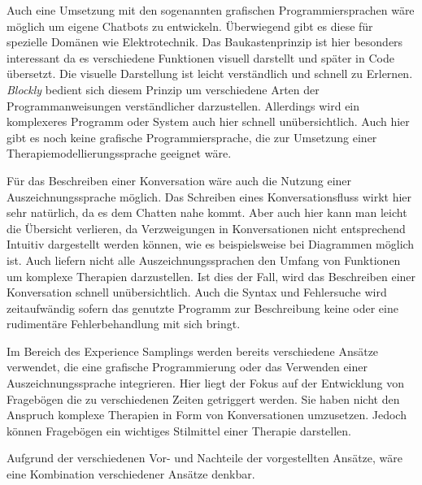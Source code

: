Auch eine Umsetzung mit den sogenannten grafischen Programmiersprachen wäre möglich um eigene Chatbots zu entwickeln. Überwiegend gibt es diese für spezielle Domänen wie Elektrotechnik. Das Baukastenprinzip ist hier besonders interessant da es verschiedene Funktionen visuell darstellt und später in Code übersetzt. Die visuelle Darstellung ist leicht verständlich und schnell zu Erlernen. \emph{Blockly} bedient sich diesem Prinzip um verschiedene Arten der Programmanweisungen verständlicher darzustellen. Allerdings wird ein komplexeres Programm oder System auch hier schnell unübersichtlich. Auch hier gibt es noch keine grafische Programmiersprache, die zur Umsetzung einer Therapiemodellierungssprache geeignet wäre. 

Für das Beschreiben einer Konversation wäre auch die Nutzung einer Auszeichnungssprache möglich. Das Schreiben eines Konversationsfluss wirkt hier sehr natürlich, da es dem Chatten nahe kommt. Aber auch hier kann man leicht die Übersicht verlieren, da Verzweigungen in Konversationen nicht entsprechend Intuitiv dargestellt werden können, wie es beispielsweise bei Diagrammen möglich ist. Auch liefern nicht alle Auszeichnungssprachen den Umfang von Funktionen um komplexe Therapien darzustellen. Ist dies der Fall, wird das Beschreiben einer Konversation schnell unübersichtlich. Auch die Syntax und Fehlersuche wird zeitaufwändig sofern das genutzte Programm zur Beschreibung keine oder eine rudimentäre Fehlerbehandlung mit sich bringt.  

Im Bereich des Experience Samplings werden bereits verschiedene Ansätze verwendet, die eine grafische Programmierung oder das Verwenden einer Auszeichnungssprache integrieren. Hier liegt der Fokus auf der Entwicklung von Fragebögen die zu verschiedenen Zeiten getriggert werden. Sie haben nicht den Anspruch komplexe Therapien in Form von Konversationen umzusetzen. Jedoch können Fragebögen ein wichtiges Stilmittel einer Therapie darstellen. 

Aufgrund der verschiedenen Vor- und Nachteile der vorgestellten Ansätze, wäre eine Kombination verschiedener Ansätze denkbar. 


